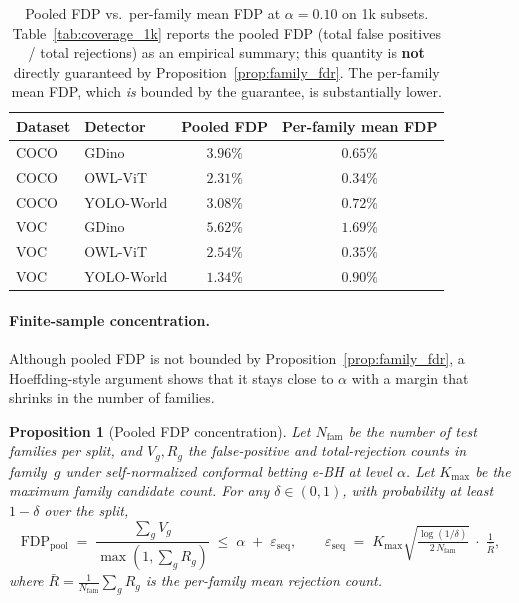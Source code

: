 \documentclass{article}
\newtheorem{proposition}{Proposition}
\theoremstyle{remark}
\newcommand{\1}{\mathbf{1}}
\begin{document}
\begin{table}[h]
\centering
\small
\begin{tabular}{llcc}
\toprule
Dataset & Detector & Pooled FDP & Per-family mean FDP \\
\midrule
COCO & GDino & $3.96\%$ & $0.65\%$ \\
COCO & OWL-ViT & $2.31\%$ & $0.34\%$ \\
COCO & YOLO-World & $3.08\%$ & $0.72\%$ \\
\midrule
VOC & GDino & $5.62\%$ & $1.69\%$ \\
VOC & OWL-ViT & $2.54\%$ & $0.35\%$ \\
VOC & YOLO-World & $1.34\%$ & $0.90\%$ \\
\bottomrule
\end{tabular}
\caption{Pooled FDP vs.\ per-family mean FDP at $\alpha=0.10$ on 1k subsets.
Table~\ref{tab:coverage_1k} reports the pooled FDP (total false positives /
total rejections) as an empirical summary; this quantity is \textbf{not}
directly guaranteed by Proposition~\ref{prop:family_fdr}. The per-family mean
FDP, which \emph{is} bounded by the guarantee, is substantially lower.}
\label{tab:pooled_fdp}
\end{table}

\paragraph{Finite-sample concentration.}
Although pooled FDP is not bounded by Proposition~\ref{prop:family_fdr},
a Hoeffding-style argument shows that it stays close to $\alpha$ with
a margin that shrinks in the number of families.

\begin{proposition}[Pooled FDP concentration]
\label{prop:pooled_concentration}
Let $N_{\mathrm{fam}}$ be the number of test families per split, and
$V_g, R_g$ the false-positive and total-rejection counts in family~$g$
under self-normalized conformal betting e-BH at level $\alpha$. Let
$K_{\max}$ be the maximum family candidate count. For any
$\delta\in(0,1)$, with probability at least $1-\delta$ over the split,
\[
\mathrm{FDP}_{\mathrm{pool}}
\;=\;\frac{\sum_g V_g}{\max(1,\sum_g R_g)}
\;\le\;\alpha \;+\; \varepsilon_{\mathrm{seq}},
\qquad
\varepsilon_{\mathrm{seq}}
\;=\; K_{\max}\sqrt{\tfrac{\log(1/\delta)}{2\,N_{\mathrm{fam}}}}
\;\cdot\;\tfrac{1}{\bar R},
\]
where $\bar R = \frac{1}{N_{\mathrm{fam}}}\sum_g R_g$ is the per-family
mean rejection count.
\end{proposition}
\end{document}
